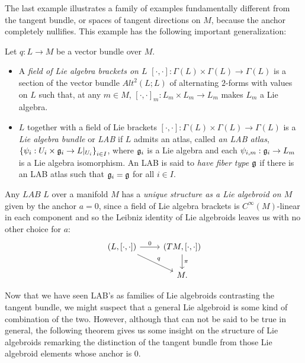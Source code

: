 The last example illustrates a family of examples fundamentally different from the tangent bundle, or spaces of tangent directions on $M$, because the anchor completely nullifies. This example has the following important generalization:

\begin{definition}\label{defnLAB}
    Let $q:L \to M$ be a vector bundle over $M$.
    
    \begin{itemize}
    
    \item A \emph{field of Lie algebra brackets on $L$} $[\cdot, \cdot]:\Gamma(L) \times \Gamma(L) \to \Gamma(L)$ is a section of the vector bundle $Alt^2(L; L)$ of alternating $2$-forms with values on $L$ such that, at any $m \in M$, $[\cdot, \cdot]_m:L_m \times L_m \to L_m$ makes $L_m$ a Lie algebra.
    
    \item $L$ together with a field of Lie brackets $[\cdot, \cdot]:\Gamma(L) \times \Gamma(L) \to \Gamma(L)$ is a \emph{Lie algebra bundle} or \emph{LAB} if $L$ admits an atlas, called \emph{an LAB atlas}, $\left\{ \psi_i: U_i \times \mathfrak{g}_i \to L|_{U_i} \right\}_{i \in I}$, where $\mathfrak{g}_i$ is a Lie algebra and each $\psi_{i, m}: \mathfrak{g}_i \to L_m$ is a Lie algebra isomorphism. An LAB is said to \emph{have fiber type $\mathfrak{g}$} if there is an LAB atlas such that $\mathfrak{g}_i = \mathfrak{g}$ for all $i \in I$.
    
    \end{itemize}
    
\end{definition}

Any $LAB$ $L$ over a manifold $M$ has a \emph{unique structure as a Lie algebroid on $M$} given by the anchor $a = 0$, since a field of Lie algebra brackets is $C^\infty(M)$-linear in each component and so the Leibniz identity of Lie algebroids leaves us with no other choice for $a$:
\begin{equation}\label{diagramLABIsAlgebroid}
    \begin{tikzcd}
    (L, [\cdot, \cdot]) \arrow{r}{0} \arrow{dr}{q} & (TM, [\cdot, \cdot]) \arrow{d}{\pi}\\
    & M.
    \end{tikzcd}
\end{equation}

Now that we have seen LAB's as families of Lie algebroids contrasting the tangent bundle, we might suspect that a general Lie algebroid is some kind of combination of the two. However, although that can not be said to be true in general, the following theorem gives us some insight on the structure of Lie algebroids remarking the distinction of the tangent bundle from those Lie algebroid elements whose anchor is $0$.

